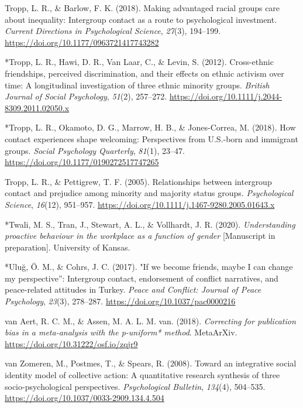 \documentclass[12pt, letterpaper]{article}
\begin{document}
\leavevmode\hypertarget{ref-tropp_making_2018}{}%
Tropp, L. R., \& Barlow, F. K. (2018). Making advantaged racial groups
care about inequality: Intergroup contact as a route to psychological
investment. \emph{Current Directions in Psychological Science},
\emph{27}(3), 194--199. \url{https://doi.org/10.1177/0963721417743282}

\leavevmode\hypertarget{ref-1743}{}%
*Tropp, L. R., Hawi, D. R., Van Laar, C., \& Levin, S. (2012).
Cross-ethnic friendships, perceived discrimination, and their effects on
ethnic activism over time: A longitudinal investigation of three ethnic
minority groups. \emph{British Journal of Social Psychology},
\emph{51}(2), 257--272.
\url{https://doi.org/10.1111/j.2044-8309.2011.02050.x}

\leavevmode\hypertarget{ref-1658}{}%
*Tropp, L. R., Okamoto, D. G., Marrow, H. B., \& Jones-Correa, M.
(2018). How contact experiences shape welcoming: Perspectives from
U.S.-born and immigrant groups. \emph{Social Psychology Quarterly},
\emph{81}(1), 23--47. \url{https://doi.org/10.1177/0190272517747265}

\leavevmode\hypertarget{ref-tropp_relationships_2005}{}%
Tropp, L. R., \& Pettigrew, T. F. (2005). Relationships between
intergroup contact and prejudice among minority and majority status
groups. \emph{Psychological Science}, \emph{16}(12), 951--957.
\url{https://doi.org/10.1111/j.1467-9280.2005.01643.x}

\leavevmode\hypertarget{ref-2394}{}%
*Twali, M. S., Tran, J., Stewart, A. L., \& Vollhardt, J. R. (2020).
\emph{Understanding proactive behaviour in the workplace as a function
of gender} {[}Manuscript in preparation{]}. University of Kansas.

\leavevmode\hypertarget{ref-286}{}%
*Uluğ, Ö. M., \& Cohrs, J. C. (2017). "If we become friends, maybe I can
change my perspective'': Intergroup contact, endorsement of conflict
narratives, and peace-related attitudes in Turkey. \emph{Peace and
Conflict: Journal of Peace Psychology}, \emph{23}(3), 278--287.
\url{https://doi.org/10.1037/pac0000216}

\leavevmode\hypertarget{ref-van_aert_correcting_2018}{}%
van Aert, R. C. M., \& Assen, M. A. L. M. van. (2018). \emph{Correcting
for publication bias in a meta-analysis with the p-uniform* method}.
MetaArXiv. \url{https://doi.org/10.31222/osf.io/zqjr9}

\leavevmode\hypertarget{ref-van_zomeren_toward_2008}{}%
van Zomeren, M., Postmes, T., \& Spears, R. (2008). Toward an
integrative social identity model of collective action: A quantitative
research synthesis of three socio-psychological perspectives.
\emph{Psychological Bulletin}, \emph{134}(4), 504--535.
\url{https://doi.org/10.1037/0033-2909.134.4.504}
\end{document}

